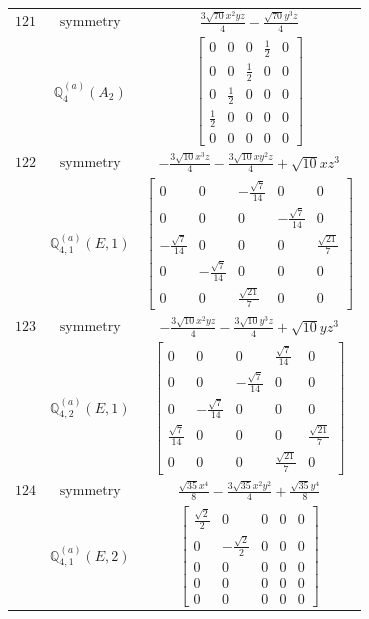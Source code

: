 \documentclass[fleqn,8pt,landscape]{jsarticle}
\begin{document}
\begin{longtable}{ccc}
$ 121 $ & $ \text{symmetry} $ & $ \frac{3 \sqrt{70} x^{2} y z}{4} - \frac{\sqrt{70} y^{3} z}{4} $ \\
$  $ & $ \mathbb{Q}_{4}^{(a)}(A_{2}) $ & $ \begin{bmatrix} 0 & 0 & 0 & \frac{1}{2} & 0 \\ 0 & 0 & \frac{1}{2} & 0 & 0 \\ 0 & \frac{1}{2} & 0 & 0 & 0 \\ \frac{1}{2} & 0 & 0 & 0 & 0 \\ 0 & 0 & 0 & 0 & 0 \end{bmatrix} $ \\ \hline
$ 122 $ & $ \text{symmetry} $ & $ - \frac{3 \sqrt{10} x^{3} z}{4} - \frac{3 \sqrt{10} x y^{2} z}{4} + \sqrt{10} x z^{3} $ \\
$  $ & $ \mathbb{Q}_{4,1}^{(a)}(E,1) $ & $ \begin{bmatrix} 0 & 0 & - \frac{\sqrt{7}}{14} & 0 & 0 \\ 0 & 0 & 0 & - \frac{\sqrt{7}}{14} & 0 \\ - \frac{\sqrt{7}}{14} & 0 & 0 & 0 & \frac{\sqrt{21}}{7} \\ 0 & - \frac{\sqrt{7}}{14} & 0 & 0 & 0 \\ 0 & 0 & \frac{\sqrt{21}}{7} & 0 & 0 \end{bmatrix} $ \\ \hline
$ 123 $ & $ \text{symmetry} $ & $ - \frac{3 \sqrt{10} x^{2} y z}{4} - \frac{3 \sqrt{10} y^{3} z}{4} + \sqrt{10} y z^{3} $ \\
$  $ & $ \mathbb{Q}_{4,2}^{(a)}(E,1) $ & $ \begin{bmatrix} 0 & 0 & 0 & \frac{\sqrt{7}}{14} & 0 \\ 0 & 0 & - \frac{\sqrt{7}}{14} & 0 & 0 \\ 0 & - \frac{\sqrt{7}}{14} & 0 & 0 & 0 \\ \frac{\sqrt{7}}{14} & 0 & 0 & 0 & \frac{\sqrt{21}}{7} \\ 0 & 0 & 0 & \frac{\sqrt{21}}{7} & 0 \end{bmatrix} $ \\ \hline
$ 124 $ & $ \text{symmetry} $ & $ \frac{\sqrt{35} x^{4}}{8} - \frac{3 \sqrt{35} x^{2} y^{2}}{4} + \frac{\sqrt{35} y^{4}}{8} $ \\
$  $ & $ \mathbb{Q}_{4,1}^{(a)}(E,2) $ & $ \begin{bmatrix} \frac{\sqrt{2}}{2} & 0 & 0 & 0 & 0 \\ 0 & - \frac{\sqrt{2}}{2} & 0 & 0 & 0 \\ 0 & 0 & 0 & 0 & 0 \\ 0 & 0 & 0 & 0 & 0 \\ 0 & 0 & 0 & 0 & 0 \end{bmatrix} $ \\ \hline

\end{longtable}
\end{document}
